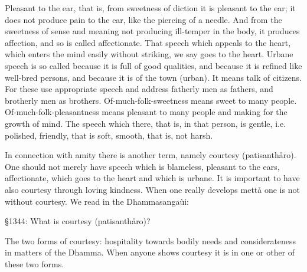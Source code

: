 \documentclass[12pt,twoside]{article}
\begin{document}
{\textasciigrave}{\textasciigrave}Pleasant to the
ear{\textquotesingle}{\textquotesingle}, that is, from sweetness of
diction it is pleasant to the ear; it does not produce pain to the ear,
like the piercing of a needle. And from the sweetness of sense and
meaning not producing ill{}-temper in the body, it produces affection,
and so is called
{\textasciigrave}{\textasciigrave}affectionate{\textquotesingle}{\textquotesingle}.
That speech which appeals to the heart, which enters the mind easily
without striking, we say {\textasciigrave}{\textasciigrave}goes to the
heart{\textquotesingle}{\textquotesingle}.
{\textasciigrave}{\textasciigrave}Urbane
speech{\textquotesingle}{\textquotesingle} is so called because it is
full of good qualities, and because it is refined like well{}-bred
persons, and because it is of the town (urban). It means talk of
citizens. For these use appropriate speech and address fatherly men as
fathers, and brotherly men as brothers.
{\textasciigrave}{\textasciigrave}Of{}-much{}-folk{}-sweetness{\textquotesingle}{\textquotesingle}
means sweet to many people.
{\textasciigrave}{\textasciigrave}Of{}-much{}-folk{}-pleasantness{\textquotesingle}{\textquotesingle}
means pleasant to many people and making for the growth of mind.
{\textasciigrave}{\textasciigrave}The speech which
there{\textquotesingle}{\textquotesingle}, that is, in that person,
{\textasciigrave}{\textasciigrave}is
gentle{\textquotesingle}{\textquotesingle}, i.e. polished,
{\textasciigrave}{\textasciigrave}friendly{\textquotesingle}{\textquotesingle},
that is soft,
{\textasciigrave}{\textasciigrave}smooth{\textquotesingle}{\textquotesingle},
that is, not harsh. 


\bigskip

In connection with amity there is another term, namely
{\textasciigrave}{\textasciigrave}courtesy{\textquotesingle}{\textquotesingle}
(patisanth{\aa}ro). One should not merely have speech which is
blameless, pleasant to the ears, affectionate, which goes to the heart
and which is urbane. It is important to have also courtesy through
loving kindness. When one really develops mett{\aa} one is not without
courtesy. We read in the Dhammasanga\`ui:


\bigskip

{\S}1344: What is courtesy (patisanth{\aa}ro)?

The two forms of courtesy: hospitality towards bodily needs and
considerateness in matters of the Dhamma. When anyone shows courtesy it
is in one or other of these two forms. 
\end{document}
